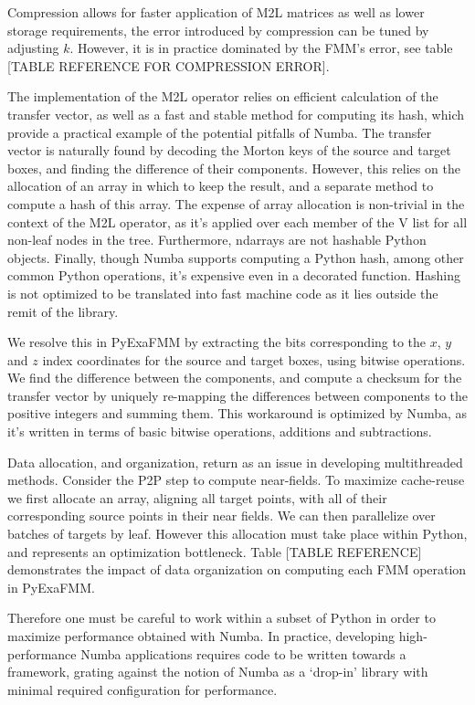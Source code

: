 \documentclass{IEEEcsmag}
\begin{document}
Compression allows for faster application of M2L matrices as well as lower storage requirements, the error introduced by compression can be tuned by adjusting $k$. However, it is in practice dominated by the FMM's error, see table [TABLE REFERENCE FOR COMPRESSION ERROR].

The implementation of the M2L operator relies on efficient calculation of the transfer vector, as well as a fast and stable method for computing its hash, which provide a practical example of the potential pitfalls of Numba. The transfer vector is naturally found by decoding the Morton keys of the source and target boxes, and finding the difference of their components. However, this relies on the allocation of an array in which to keep the result, and a separate method to compute a hash of this array. The expense of array allocation is non-trivial in the context of the M2L operator, as it's applied over each member of the V list for all non-leaf nodes in the tree. Furthermore, ndarrays are not hashable Python objects. Finally, though Numba supports computing a Python hash, among other common Python operations, it's expensive even in a decorated function. Hashing is not optimized to be translated into fast machine code as it lies outside the remit of the library.

We resolve this in PyExaFMM by extracting the bits corresponding to the $x$, $y$ and $z$ index coordinates for the source and target boxes, using bitwise operations. We find the difference between the components, and compute a checksum for the transfer vector by uniquely re-mapping the differences between components to the positive integers and summing them. This workaround is optimized by Numba, as it's written in terms of basic bitwise operations, additions and subtractions.

Data allocation, and organization, return as an issue in developing multithreaded methods. Consider the P2P step to compute near-fields. To maximize cache-reuse we first allocate an array, aligning all target points, with all of their corresponding source points in their near fields. We can then parallelize over batches of targets by leaf. However this allocation must take place within Python, and represents an optimization bottleneck. Table [TABLE REFERENCE] demonstrates the impact of data organization on computing each FMM operation in PyExaFMM.

Therefore one must be careful to work within a subset of Python in order to maximize performance obtained with Numba. In practice, developing high-performance Numba applications requires code to be written towards a framework, grating against the notion of Numba as a `drop-in' library with minimal required configuration for performance.
\end{document}
